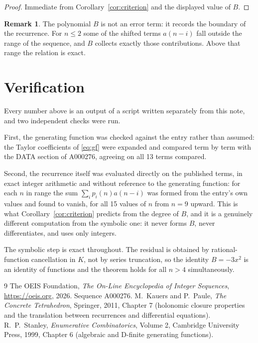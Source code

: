 \documentclass[11pt,a4paper]{article}
\theoremstyle{plain}
\theoremstyle{definition}
\newtheorem{remark}[theorem]{Remark}
\begin{document}
\begin{proof}
Immediate from Corollary~\ref{cor:criterion} and the displayed value of $B$.
\end{proof}

\begin{remark}
The polynomial $B$ is not an error term: it records the boundary of the recurrence. For
$n\le2$ some of the shifted terms $a(n-i)$ fall outside the range of the sequence,
and $B$ collects exactly those contributions. Above that range the relation is exact.
\end{remark}

\section{Verification}

Every number above is an output of a script written separately from this note, and two
independent checks were run.

First, the generating function was checked against the entry rather than assumed: the
Taylor coefficients of \eqref{eq:gf} were expanded and compared term by term with the DATA
section of A000276, agreeing on all 13 terms compared.

Second, the recurrence itself was evaluated directly on the published terms, in exact
integer arithmetic and without reference to the generating function: for each $n$ in range
the sum $\sum_{i}p_{i}(n)a(n-i)$ was formed from the entry's own values and found to
vanish, for all 15 values of $n$ from $n=9$ upward. This is what
Corollary~\ref{cor:criterion} predicts from the degree of $B$, and it is a genuinely
different computation from the symbolic one: it never forms $B$, never differentiates, and
uses only integers.

The symbolic step is exact throughout. The residual is obtained by rational-function
cancellation in $K$, not by series truncation, so the identity $B=- 3 x^{2}$ is an
identity of functions and the theorem holds for all $n>4$ simultaneously.

\begin{thebibliography}{9}
 The OEIS Foundation, \emph{The On-Line Encyclopedia of Integer Sequences},
\url{https://oeis.org}, 2026. Sequence A000276.
 M.~Kauers and P.~Paule, \emph{The Concrete Tetrahedron}, Springer, 2011,
Chapter 7 (holonomic closure properties and the translation between recurrences and
differential equations).
 R.~P.~Stanley, \emph{Enumerative Combinatorics}, Volume 2, Cambridge
University Press, 1999, Chapter 6 (algebraic and D-finite generating functions).
\end{thebibliography}
\end{document}
